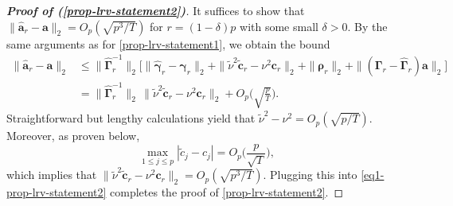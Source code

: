 \begin{proof}[\textnormal{\textbf{Proof of (\ref{prop-lrv-statement2})}}] 
It suffices to show that $\| \widehat{\boldsymbol{a}}_r - \boldsymbol{a} \|_2 = O_p(\sqrt{p^3/T})$ for $r = (1-\delta) p$ with some small $\delta > 0$. By the same arguments as for \eqref{prop-lrv-statement1}, we obtain the bound
\begin{align}
\| \widehat{\boldsymbol{a}}_r - \boldsymbol{a} \|_2 
 & \le \| \widehat{\boldsymbol{\Gamma}}_r^{-1} \|_2 \Big[ \| \widehat{\boldsymbol{\gamma}}_r - \boldsymbol{\gamma}_r \|_2 + \| \widetilde{\nu}^2 \widetilde{\boldsymbol{c}}_r - \nu^2 \boldsymbol{c}_r \|_2 + \| \boldsymbol{\rho}_r \|_2 + \| (\boldsymbol{\Gamma}_r - \widehat{\boldsymbol{\Gamma}}_r) \boldsymbol{a} \|_2 \Big] \nonumber \\
 & = \| \widehat{\boldsymbol{\Gamma}}_r^{-1} \|_2 \, \| \widetilde{\nu}^2 \widetilde{\boldsymbol{c}}_r - \nu^2 \boldsymbol{c}_r \|_2 + O_p\Big(\sqrt{\frac{p}{T}}\Big). \label{eq1-prop-lrv-statement2}
\end{align}
Straightforward but lengthy calculations yield that $\widetilde{\nu}^2 - \nu^2 = O_p(\sqrt{p/T})$. Moreover, as proven below, 
\begin{equation}\label{eq2-prop-lrv-statement2}
\max_{1 \le j \le p} | \widetilde{c}_j - c_j | = O_p\Big( \frac{p}{\sqrt{T}} \Big), 
\end{equation}
which implies that $\| \widetilde{\nu}^2 \widetilde{\boldsymbol{c}}_r - \nu^2 \boldsymbol{c}_r \|_2 = O_p(\sqrt{p^3/T})$. Plugging this into \eqref{eq1-prop-lrv-statement2} completes the proof of \eqref{prop-lrv-statement2}. 



\end{proof}
